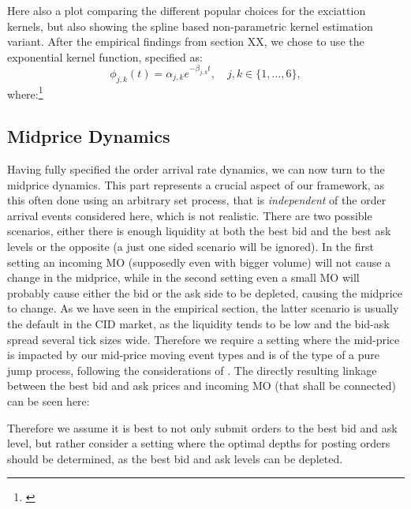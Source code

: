 \documentclass[12pt,a4paper]{cau_thesis}
\begin{document}
Here also a plot comparing the different popular choices for the
exciattion kernels, but also showing the spline based non-parametric
kernel estimation variant. After the empirical findings from section
XX, we chose to use the exponential kernel function, specified as:
\begin{equation}\label{eq:exponential_kernel}
    \phi_{j, k}(t) = \alpha_{j, k} e^{-\beta_{j, k}t}, \quad j, k \in \{1, \ldots, 6\},
\end{equation}
where:\footnote{\cite[See ][, p.80]{luckner2021hawkes}}
\subsection{Midprice Dynamics}\label{sub_sec:midprice_dynamics}
Having fully specified the order arrival rate dynamics, we can now turn
to the midprice dynamics. This part represents a crucial aspect of our
framework, as this often done using an arbitrary set process, that is
\emph{independent} of the order arrival events considered here, which is not
realistic. There are two possible scenarios, either there is enough
liquidity at both the best bid and the best ask levels or the
opposite (a just one sided scenario will be ignored). In the first
setting an incoming MO (supposedly even with bigger volume) will not
cause a change in the midprice, while in the second setting even a
small MO will probably cause either the bid or the ask side to be
depleted, causing the midprice to change. As we have seen in the
empirical section, the latter scenario is usually the default in the
CID market, as the liquidity tends to be low and the bid-ask spread several
tick sizes wide. Therefore we require a setting where the mid-price
is impacted by our mid-price moving event types and is of the type of
a pure jump process, following the considerations of \cite[see][,
    p.7]{law2015pure}. The directly resulting linkage between the best
bid and ask prices and incoming MO (that shall be connected) can be
seen here: \cite[see][, p.8]{law2015pure}

Therefore we assume it is best to not only submit orders to the best
bid and ask level, but rather consider a setting where the optimal
depths for posting orders should be determined, as the best bid and
ask levels can be depleted.
\end{document}
